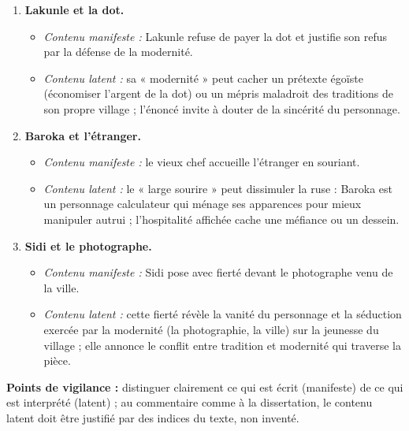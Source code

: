 \documentclass[11pt]{article}
\begin{document}
\begin{corrige}

\begin{enumerate}
\item \textbf{Lakunle et la dot.}
\begin{itemize}
\item \emph{Contenu manifeste :} Lakunle refuse de payer la dot et justifie son refus par la défense de la modernité.
\item \emph{Contenu latent :} sa « modernité » peut cacher un prétexte égoïste (économiser l'argent de la dot) ou un mépris maladroit des traditions de son propre village ; l'énoncé invite à douter de la sincérité du personnage.
\end{itemize}

\item \textbf{Baroka et l'étranger.}
\begin{itemize}
\item \emph{Contenu manifeste :} le vieux chef accueille l'étranger en souriant.
\item \emph{Contenu latent :} le « large sourire » peut dissimuler la ruse : Baroka est un personnage calculateur qui ménage ses apparences pour mieux manipuler autrui ; l'hospitalité affichée cache une méfiance ou un dessein.
\end{itemize}

\item \textbf{Sidi et le photographe.}
\begin{itemize}
\item \emph{Contenu manifeste :} Sidi pose avec fierté devant le photographe venu de la ville.
\item \emph{Contenu latent :} cette fierté révèle la vanité du personnage et la séduction exercée par la modernité (la photographie, la ville) sur la jeunesse du village ; elle annonce le conflit entre tradition et modernité qui traverse la pièce.
\end{itemize}
\end{enumerate}

\textbf{Points de vigilance :} distinguer clairement ce qui est écrit (manifeste) de ce qui est interprété (latent) ; au commentaire comme à la dissertation, le contenu latent doit être justifié par des indices du texte, non inventé.
\end{corrige}
\end{document}
